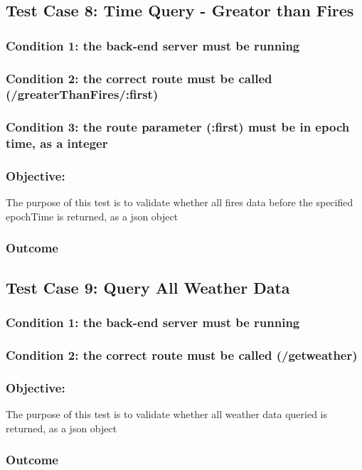 \subsection{Test Case 8: Time Query - Greator than Fires}
\subsubsection{Condition 1: the back-end server must be running}
\subsubsection{Condition 2: the correct route must be called (/greaterThanFires/:first)}
\subsubsection{Condition 3: the route parameter (:first) must be in epoch time, as a integer}
\subsubsection{Objective:} The purpose of this test is to validate whether all fires data before the specified epochTime is returned, as a json object
\subsubsection{Outcome}


\subsection{Test Case 9: Query All Weather Data}
\subsubsection{Condition 1: the back-end server must be running}
\subsubsection{Condition 2: the correct route must be called (/getweather)}

\subsubsection{Objective:} The purpose of this test is to validate whether all weather data queried is returned, as a json object
\subsubsection{Outcome}


